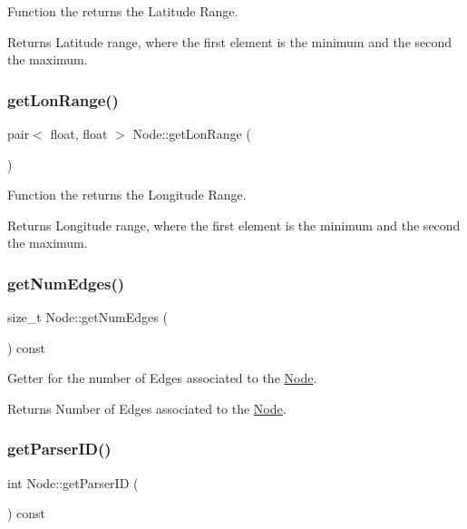 Function the returns the Latitude Range.

\begin{DoxyReturn}{Returns}
Latitude range, where the first element is the minimum and the second the maximum. 
\end{DoxyReturn}
\hypertarget{class_node_a8533c4ac90cb7bc99895546b161e7d5a}{}\label{class_node_a8533c4ac90cb7bc99895546b161e7d5a} 
\subsubsection{\texorpdfstring{get\+Lon\+Range()}{getLonRange()}}
{\footnotesize\ttfamily pair$<$ float, float $>$ Node\+::get\+Lon\+Range (\begin{DoxyParamCaption}{ }\end{DoxyParamCaption})\hspace{0.3cm}{\ttfamily [static]}}

Function the returns the Longitude Range.

\begin{DoxyReturn}{Returns}
Longitude range, where the first element is the minimum and the second the maximum. 
\end{DoxyReturn}
\hypertarget{class_node_abc4a69053f8f664c9b6a6a6bbe5d8c68}{}\label{class_node_abc4a69053f8f664c9b6a6a6bbe5d8c68} 
\subsubsection{\texorpdfstring{get\+Num\+Edges()}{getNumEdges()}}
{\footnotesize\ttfamily size\+\_\+t Node\+::get\+Num\+Edges (\begin{DoxyParamCaption}{ }\end{DoxyParamCaption}) const}

Getter for the number of Edges associated to the \hyperlink{class_node}{Node}.

\begin{DoxyReturn}{Returns}
Number of Edges associated to the \hyperlink{class_node}{Node}. 
\end{DoxyReturn}
\hypertarget{class_node_ab79cb8588caac0a2d0dd99d7e7dd2f28}{}\label{class_node_ab79cb8588caac0a2d0dd99d7e7dd2f28} 
\subsubsection{\texorpdfstring{get\+Parser\+I\+D()}{getParserID()}}
{\footnotesize\ttfamily int Node\+::get\+Parser\+ID (\begin{DoxyParamCaption}{ }\end{DoxyParamCaption}) const}

